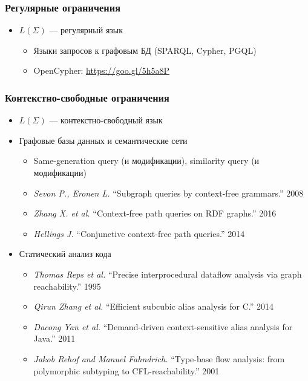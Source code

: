 \documentclass[xcolor=table,aspectratio=169]{beamer}
\begin{document}
\begin{frame}[fragile]
  \transwipe[direction=90]
  \frametitle{Регулярные ограничения}
  \begin{itemize}
  \item $L(\Sigma)$ --- регулярный язык
    \begin{itemize}
      \item Языки запросов к графовым БД (SPARQL, Cypher, PGQL)
      \item OpenCypher: \url{https://goo.gl/5h5a8P}
    \end{itemize}  
  \end{itemize}
\end{frame}


\begin{frame}[fragile]
  \transwipe[direction=90]
  \frametitle{Контекстно-свободные ограничения}
  \begin{itemize}
  \item $L(\Sigma)$ --- контекстно-свободный язык
  \item Графовые базы данных и семантические сети
    \begin{itemize}
        \item Same-generation query (и модификации), similarity query (и модификации)
        \item \emph{Sevon P., Eronen L.} ``Subgraph queries by context-free grammars.'' 2008
        \item \emph{Zhang X. et al.} ``Context-free path queries on RDF graphs.'' 2016
        \item \emph{Hellings J.} ``Conjunctive context-free path queries.'' 2014
    \end{itemize}
    \item Статический анализ кода
    \begin{itemize}
        \item \emph{Thomas Reps et al.} ``Precise interprocedural dataflow analysis via graph reachability.'' 1995 
        \item \emph{Qirun Zhang et al.}  ``Efficient subcubic alias analysis for C.'' 2014
        \item \emph{Dacong Yan et al.} ``Demand-driven context-sensitive alias analysis for Java.'' 2011
        \item \emph{Jakob Rehof and Manuel Fahndrich.} ``Type-base flow analysis: from polymorphic subtyping to CFL-reachability.'' 2001
    \end{itemize}
  \end{itemize}
\end{frame}
\end{document}
